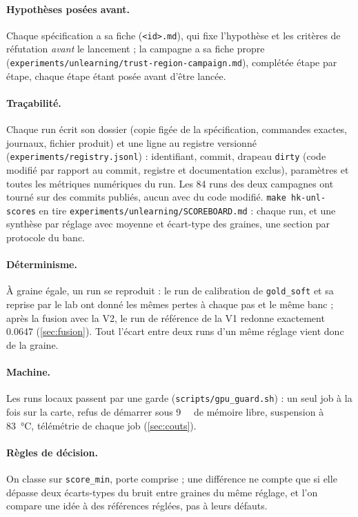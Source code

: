 \documentclass[11pt,a4paper]{article}
\newcommand{\code}[1]{\texttt{#1}}
\newcommand{\chemin}[1]{\nolinkurl{#1}}%
\begin{document}
\paragraph{Hypothèses posées avant.} Chaque spécification a sa fiche (\code{<id>.md}), qui fixe
l'hypothèse et les critères de réfutation \emph{avant} le lancement ; la campagne a sa fiche propre
(\chemin{experiments/unlearning/trust-region-campaign.md}), complétée étape par étape, chaque étape
étant posée avant d'être lancée.

\paragraph{Traçabilité.} Chaque run écrit son dossier (copie figée de la spécification, commandes
exactes, journaux, fichier produit) et une ligne au registre versionné
(\chemin{experiments/registry.jsonl}) : identifiant, commit, drapeau \code{dirty} (code modifié par
rapport au commit, registre et documentation exclus), paramètres et toutes les métriques
numériques du run. Les 84 runs des deux campagnes ont tourné sur des commits publiés, aucun avec du
code modifié.
\code{make hk-unl-scores} en tire \chemin{experiments/unlearning/SCOREBOARD.md} : chaque run, et
une synthèse par réglage avec moyenne et écart-type des graines, une section par protocole du
banc.

\paragraph{Déterminisme.} À graine égale, un run se reproduit : le run de calibration de
\code{gold\_soft} et sa reprise par le lab ont donné les mêmes pertes à chaque pas et le même banc ;
après la fusion avec la V2, le run de référence de la V1 redonne exactement \num{0.0647}
(\cref{sec:fusion}). Tout l'écart entre deux runs d'un même réglage vient donc de la graine.

\paragraph{Machine.} Les runs locaux passent par une garde (\chemin{scripts/gpu_guard.sh}) : un
seul job à la fois sur la carte, refus de démarrer sous \SI{9}{\giga\byte} de mémoire libre,
suspension à \SI{83}{\celsius}, télémétrie de chaque job (\cref{sec:couts}).

\paragraph{Règles de décision.} On classe sur \code{score\_min}, porte comprise ; une différence ne
compte que si elle dépasse deux écarts-types du bruit entre graines du même réglage, et l'on
compare une idée à des références réglées, pas à leurs défauts.
\end{document}

